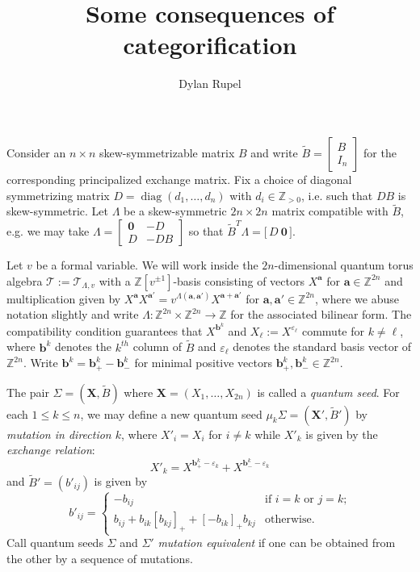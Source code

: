 \documentclass{amsart}
\title{Some consequences of categorification}
\author[Rupel]{Dylan Rupel}
\newcommand{\bfa}{\mathbf{a}}
\newcommand{\bfb}{\mathbf{b}}
\newcommand{\bfX}{\mathbf{X}}
\newcommand{\cT}{\mathcal{T}}
\newcommand{\diag}{\operatorname{diag}}
\newcommand{\ZZ}{\mathbb{Z}}
\begin{document}
\maketitle

 Consider an $n\times n$ skew-symmetrizable matrix $B$ and write $\tilde B=\left[\begin{array}{c}B\\ I_n\end{array}\right]$ for the corresponding principalized exchange matrix.  Fix a choice of diagonal symmetrizing matrix $D=\diag(d_1,\ldots,d_n)$ with $d_i\in\ZZ_{>0}$, i.e. such that $DB$ is skew-symmetric.  Let $\Lambda$ be a skew-symmetric $2n\times2n$ matrix compatible with $\tilde B$, e.g. we may take $\Lambda=\left[\begin{array}{cc}\boldsymbol{0} & -D\\ D & -DB\end{array}\right]$ so that $\tilde B^T\Lambda=\big[\,D\ \boldsymbol{0}\,\big]$.  

 Let $v$ be a formal variable.  We will work inside the $2n$-dimensional quantum torus algebra $\cT:=\cT_{\Lambda,v}$ with a $\ZZ[v^{\pm1}]$-basis consisting of vectors $X^\bfa$ for $\bfa\in\ZZ^{2n}$ and multiplication given by $X^\bfa X^{\bfa'}=v^{\Lambda(\bfa,\bfa')}X^{\bfa+\bfa'}$ for $\bfa,\bfa'\in\ZZ^{2n}$, where we abuse notation slightly and write $\Lambda:\ZZ^{2n}\times\ZZ^{2n}\to\ZZ$ for the associated bilinear form.  The compatibility condition guarantees that $X^{\bfb^k}$ and $X_\ell:=X^{\varepsilon_\ell}$ commute for $k\ne\ell$, where $\bfb^k$ denotes the $k^{th}$ column of $\tilde B$ and $\varepsilon_\ell$ denotes the standard basis vector of $\ZZ^{2n}$.  Write $\bfb^k=\bfb^k_+-\bfb^k_-$ for minimal positive vectors $\bfb^k_+,\bfb^k_-\in\ZZ^{2n}$.

 The pair $\Sigma=(\bfX,\tilde B)$ where $\bfX=(X_1,\ldots,X_{2n})$ is called a \emph{quantum seed}.  For each $1\le k\le n$, we may define a new quantum seed $\mu_k\Sigma=(\bfX',\tilde B')$ by \emph{mutation in direction $k$}, where $X'_i=X_i$ for $i\ne k$ while $X'_k$ is given by the \emph{exchange relation}:
 \[X'_k=X^{\bfb_+^k-\varepsilon_k}+X^{\bfb_-^k-\varepsilon_k}\]
 and $\tilde B'=(b'_{ij})$ is given by
 \[b'_{ij}=\begin{cases}-b_{ij} & \text{if $i=k$ or $j=k$;}\\ b_{ij}+b_{ik}[b_{kj}]_++[-b_{ik}]_+b_{kj} & \text{otherwise.}\end{cases}\]
 Call quantum seeds $\Sigma$ and $\Sigma'$ \emph{mutation equivalent} if one can be obtained from the other by a sequence of mutations.
\end{document}
